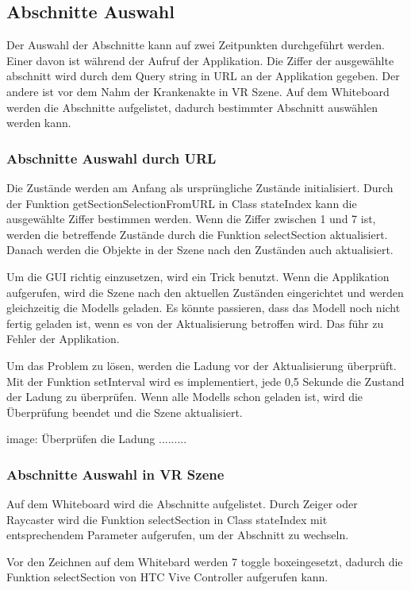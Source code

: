  \subsection{Abschnitte Auswahl}
 Der Auswahl der Abschnitte kann auf zwei Zeitpunkten durchgeführt werden. Einer davon ist während der Aufruf der Applikation. Die Ziffer der ausgewählte abschnitt wird durch dem Query string in URL an der Applikation gegeben. Der andere ist vor dem Nahm der Krankenakte in VR Szene. Auf dem Whiteboard werden die Abschnitte aufgelistet, dadurch bestimmter Abschnitt auswählen werden kann.
 
  \subsubsection{Abschnitte Auswahl durch URL}
  Die Zustände werden am Anfang als ursprüngliche Zustände initialisiert. Durch der Funktion getSectionSelectionFromURL in Class stateIndex kann die ausgewählte Ziffer bestimmen werden. Wenn die Ziffer zwischen 1 und 7 ist, werden die betreffende Zustände durch die Funktion selectSection aktualisiert. Danach werden die Objekte in der Szene nach den Zuständen auch aktualisiert.
  
  Um die GUI richtig einzusetzen, wird ein Trick benutzt. Wenn die Applikation aufgerufen, wird die Szene nach den aktuellen Zuständen eingerichtet und werden gleichzeitig die Modells geladen. Es könnte passieren, dass das Modell noch nicht fertig geladen ist, wenn es von der Aktualisierung betroffen wird. Das führ zu Fehler der Applikation.
  
  Um das Problem zu lösen, werden die Ladung vor der Aktualisierung überprüft. Mit der Funktion setInterval wird es implementiert, jede 0,5 Sekunde die Zustand der Ladung zu überprüfen. Wenn alle Modells schon geladen ist, wird die Überprüfung beendet und die Szene aktualisiert.
  
  image: Überprüfen die Ladung .........
  
  \subsubsection{Abschnitte Auswahl in VR Szene}
  Auf dem Whiteboard wird die Abschnitte aufgelistet. Durch Zeiger oder Raycaster wird die Funktion selectSection in Class stateIndex mit entsprechendem Parameter aufgerufen, um der Abschnitt zu wechseln.
  
  Vor den Zeichnen auf dem Whitebard werden 7 \glqq toggle box\grqq eingesetzt, dadurch die Funktion selectSection von HTC Vive Controller aufgerufen kann.
  
